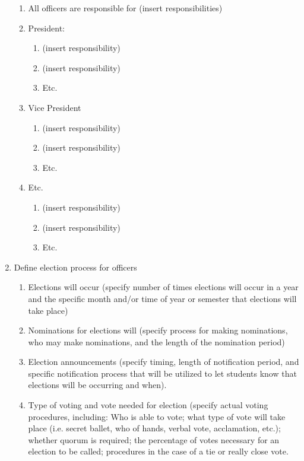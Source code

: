 \documentclass[11pt,a4paper,notitlepage]{article}
\begin{document}
\begin{enumerate}[label=\Alph*.]
    \begin{enumerate}[label=\arabic*.]
      \item All officers are responsible for (insert responsibilities)
      \item President:
        \begin{enumerate}[label=\alph*.]
          \item (insert responsibility)
          \item (insert responsibility)
          \item Etc.
        \end{enumerate}
      \item Vice President
        \begin{enumerate}[label=\alph*.]
          \item (insert responsibility)
          \item (insert responsibility)
          \item Etc.
        \end{enumerate}
      \item Etc.
        \begin{enumerate}[label=\alph*.]
          \item (insert responsibility)
          \item (insert responsibility)
          \item Etc.
        \end{enumerate}
    \end{enumerate}
  \item Define election process for officers
    \begin{enumerate}[label=\arabic*.]
      \item Elections will occur (specify number of times elections will occur in a year and the specific month and/or time of year or semester that elections will take place)
      \item Nominations for elections will (specify process for making nominations, who may make nominations, and the length of the nomination period)
      \item Election announcements (specify timing, length of notification period, and specific notification process that will be utilized to let students know that elections will be occurring and when).
      \item Type of voting and vote needed for election (specify actual voting procedures, including:  Who is able to vote; what type of vote will take place (i.e. secret ballet, who of hands, verbal vote, acclamation, etc.); whether quorum is required; the percentage of votes necessary for an election to be called; procedures in the case of a tie or really close vote.

\end{enumerate}
\end{enumerate}
\end{document}
